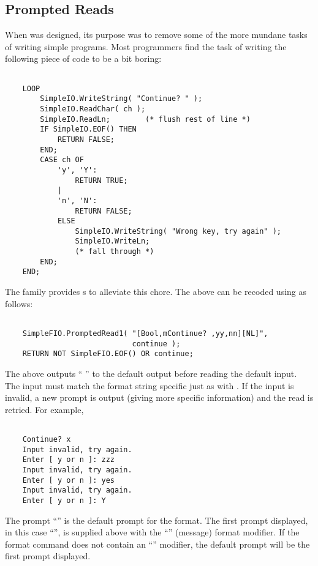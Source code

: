 \subsection{ Prompted Reads}
 
\label{PromptedReads}

When  was designed, its purpose was to remove some
of the more mundane tasks of writing simple programs.  Most programmers
find the task of writing the following piece of code to be a bit boring:
\begin{verbatim}

    LOOP
        SimpleIO.WriteString( "Continue? " );
        SimpleIO.ReadChar( ch );
        SimpleIO.ReadLn;        (* flush rest of line *)
        IF SimpleIO.EOF() THEN
            RETURN FALSE;
        END;
        CASE ch OF
            'y', 'Y':
                RETURN TRUE;
            |
            'n', 'N':
                RETURN FALSE;
            ELSE
                SimpleIO.WriteString( "Wrong key, try again" );
                SimpleIO.WriteLn;
                (* fall through *)
        END;
    END;
\end{verbatim}

The  family provides s to alleviate this
chore.
The above can be recoded using 
as follows:
\begin{verbatim}

    SimpleFIO.PromptedRead1( "[Bool,mContinue? ,yy,nn][NL]", 
                             continue );
    RETURN NOT SimpleFIO.EOF() OR continue;

\end{verbatim}
The  above outputs `` '' to
the default output before reading the default input.  The input
must match the format string specific just as with . If 
the input is invalid, a new prompt is output (giving more specific
information) and the read is retried.  For example,
\begin{verbatim}
    
    Continue? x
    Input invalid, try again.
    Enter [ y or n ]: zzz
    Input invalid, try again.
    Enter [ y or n ]: yes
    Input invalid, try again.
    Enter [ y or n ]: Y

\end{verbatim}
The prompt ``'' is the default prompt
for the \code{[Bool]} format.  The first prompt displayed,
in this case ``'', is supplied above with the
``'' (message) format modifier.  If the format command does
not contain an ``'' modifier, the default prompt will be
the first prompt displayed.

